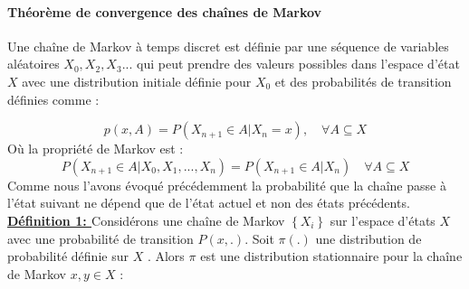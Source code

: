 
\paragraph{Théorème de convergence des chaînes de Markov \cite{entezari2018bayesian} \cite{meyn2012markov} \cite{rosenthal2006first}}
Une chaîne de Markov à temps discret est définie par une séquence de variables aléatoires \(\displaystyle X_{0}, X_{2}, X_{3} ... \) qui peut prendre des valeurs possibles dans l'espace d'état \(\displaystyle X \) avec une distribution initiale définie pour \(\displaystyle X_{0}\) et des probabilités de transition définies comme :

\begin{equation}
	p(x,A) = P(X_{n+1} \in A | X_{n} = x), \hspace{1em} \forall A \subseteq X
\end{equation}
Où la propriété de Markov est :
\begin{equation}
	P(X_{n+1} \in A | X_{0},X_{1},...,X_{n}) = P(X_{n+1} \in A | X_{n})  \hspace{1em} \forall A \subseteq X
\end{equation}
Comme nous l’avons évoqué précédemment la probabilité que la chaîne passe à l'état suivant ne dépend que de l'état actuel et non des états précédents. \\
\textbf{\underline{Définition 1: }} Considérons une chaîne de Markov \(\displaystyle \left\{ X_{i} \right\} \) sur l'espace d'états \(\displaystyle X \) avec une probabilité de transition \(\displaystyle P(x,.) \). Soit \(\displaystyle \pi (.) \) une distribution de probabilité définie sur \(\displaystyle X \) . Alors \(\displaystyle \pi \) est une distribution stationnaire pour la chaîne de Markov  \(\displaystyle x,y \in X \) :

